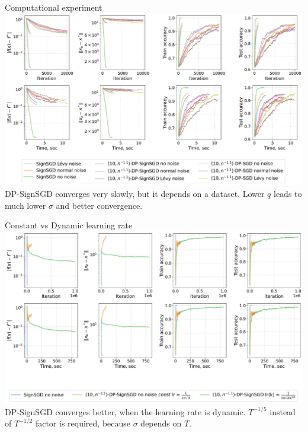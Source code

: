 \documentclass{beamer}
\begin{document}
\begin{frame}{Computational experiment}
    \includegraphics[width=1.0\textwidth]{v28_constant_step/long/v28_constant_step_long.pdf} 
DP-SignSGD converges very slowly, but it depends on a dataset. Lower $q$ leads to much lower $\sigma$ and better convergence.
\end{frame}
\begin{frame}{Constant vs Dynamic learning rate}
    \includegraphics[width=1.0\textwidth]{v28_dynamic_step/long/v28_dynamic_step_long.pdf} 
DP-SignSGD converges better, when the learning rate is dynamic. $T^{-1/5}$ instead of $T^{-1/2}$ factor is required, because $\sigma$ depends on $T$.
\end{frame}
\end{document}
